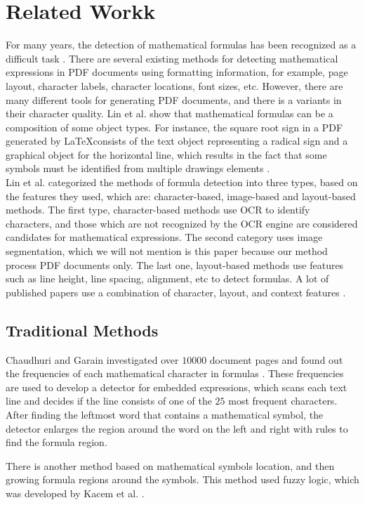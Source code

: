 \section{Related Workk}
For many years, the detection of mathematical formulas has been recognized as a difficult task \cite{Chan2000}. There are several existing methods for detecting mathematical expressions in PDF documents using formatting information, for example, page layout, character labels, character locations, font sizes, etc.  However, there are many different tools for generating PDF documents, and there is a variants in their character quality. Lin et al. \cite{Lin2011} show that mathematical formulas can be a composition of some object types. For instance, the square root sign in a PDF generated by \LaTeX consists of the text object representing a radical sign and a graphical object for the horizontal line, which results in the fact that some symbols must be identified from multiple drawings elements \cite{Mali2020}. \\
Lin et al. \cite{Lin2011} categorized the methods of formula detection into three types, based on the features they used, which are: character-based, image-based and layout-based methods. The first type, character-based methods use OCR to identify characters, and those which are not recognized by the OCR engine are considered candidates for mathematical expressions. The second category uses image segmentation, which we will not mention is this paper because our method process PDF documents only. The last one, layout-based methods use features such as line height, line spacing, alignment, etc to detect formulas. A lot of published papers use a combination of character, layout, and context features
\cite{Mali2020}.

\subsection{Traditional Methods}
Chaudhuri and Garain investigated over $10000$ document pages and found out the frequencies of each mathematical character in formulas \cite{Chaudhuri1998AnAF}. These frequencies are used to develop a detector for embedded expressions, which scans each text line and decides if the line consists of one of the $25$ most frequent characters. After finding the leftmost word that contains a mathematical symbol, the detector enlarges the region around the word on the left and right with rules to find the formula region.


There is another method based on mathematical symbols location, and then growing formula regions around the symbols. This method used fuzzy logic, which was developed by Kacem et al. \cite{Kacem2001}.

